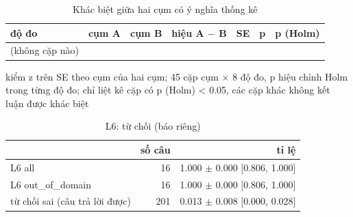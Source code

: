 \begin{table}[ht]
\centering
\caption{Khác biệt giữa hai cụm có ý nghĩa thống kê}
\begin{tabular}{lrrrrrr}
\toprule
độ đo & cụm A & cụm B & hiệu A $-$ B & SE & p & p (Holm) \\
\midrule
(không cặp nào) &  &  &  &  &  &  \\
\bottomrule
\end{tabular}
\par\smallskip\footnotesize kiểm z trên SE theo cụm của hai cụm; 45 cặp cụm × 8 độ đo, p hiệu chỉnh Holm trong từng độ đo; chỉ liệt kê cặp có p (Holm) < 0.05, các cặp khác không kết luận được khác biệt
\end{table}

\begin{table}[ht]
\centering
\caption{L6: từ chối (báo riêng)}
\begin{tabular}{lrr}
\toprule
 & số câu & tỉ lệ \\
\midrule
L6 all & 16 & 1.000 $\pm$ 0.000 [0.806, 1.000] \\
L6 out\_of\_domain & 16 & 1.000 $\pm$ 0.000 [0.806, 1.000] \\
từ chối sai (câu trả lời được) & 201 & 0.013 $\pm$ 0.008 [0.000, 0.028] \\
\bottomrule
\end{tabular}
\end{table}

